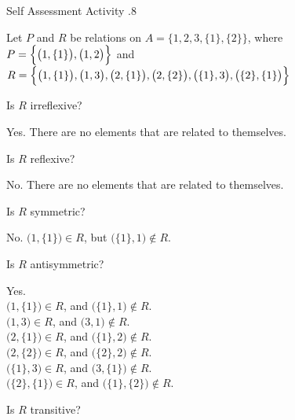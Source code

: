 \documentclass[\main/notes.tex]{subfiles}
\begin{document}
				\begin{exercise}{Self Assessment Activity \thechapter.8}
					\begin{questions}
						\item Let $P$ and $R$ be relations on $A = \bigl\{1, 2, 3, \{1\}, \{2\}\bigr\}$, where\\
						$P = \Bigl\{\bigl(1, \{1\}\bigr), \bigl(1, 2\bigr)\Bigr\}$ and $R = \Bigl\{\bigl(1, \{1\}\bigr), \bigl(1, 3\bigr), \bigl(2, \{1\}\bigr), \bigl(2, \{2\}\bigr), \bigl(\{1\}, 3\bigr), \bigl(\{2\}, \{1\}\bigr) \Bigr\}$
							\begin{questions}
								\item Is $R$ irreflexive?\\
									\begin{answer}
										Yes. There are no elements that are related to themselves.
									\end{answer}
								\item Is $R$ reflexive?\\
									\begin{answer}
										No. There are no elements that are related to themselves.
									\end{answer}
								\item Is $R$ symmetric?\\
									\begin{answer}
										No. $\bigl(1, \{1\}\bigr) \in R$, but $\bigl(\{1\}, 1\bigr) \notin R$.
									\end{answer}
								\item Is $R$ antisymmetric?\\
									\begin{answer}
										Yes.\\
										$\bigl(1, \{1\}\bigr) \in R$, and $\bigl(\{1\}, 1\bigr) \notin R$.\\
										$\bigl(1, 3\bigr) \in R$, and $\bigl(3, 1\bigr) \notin R$.\\
										$\bigl(2, \{1\}\bigr) \in R$, and $\bigl(\{1\}, 2\bigr) \notin R$.\\
										$\bigl(2, \{2\}\bigr) \in R$, and $\bigl(\{2\}, 2\bigr) \notin R$.\\
										$\bigl(\{1\}, 3\bigr) \in R$, and $\bigl(3, \{1\}\bigr) \notin R$.\\
										$\bigl(\{2\}, \{1\}\bigr) \in R$, and $\bigl(\{1\}, \{2\}\bigr) \notin R$.
									\end{answer}
								\item Is $R$ transitive?\\

\end{questions}
\end{questions}
\end{exercise}
\end{document}

